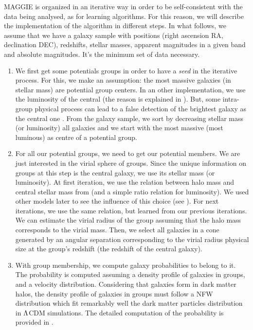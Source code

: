 MAGGIE is organized in an iterative way in order to be self-consistent with
the data being analysed, as for learning algorithms. For this reason, we
will describe the implementation of the algorithm in different steps. In
what follows, we assume that we have a galaxy sample with
positions (right ascension RA, declination DEC), redshifts, stellar masses,
apparent magnitudes in a given band and absolute magnitudes. It's the
minimum set of data necessary.
%
\begin{enumerate}
    \item We first get some potentials groups in order to have a \emph{seed} in
        the iterative process. For this, we make an assumption: the most
        massive galaxies (in stellar mass) are potential group centers. In an
        other implementation, we use the luminosity of the central (the reason
        is explained in ). But, some
        intra-group physical process can lead to a false detection of the
        brightest galaxy as the central one \citep{Ebeling+13}. From the galaxy
        sample, we sort by decreasing stellar mass (or luminosity) all galaxies
        and we start with the most massive (most luminous) as centre of a
        potential group.

    \item\label{step:2} For all our potential groups, we need to get our
        potential members. We are just interested in the virial sphere of
        groups. Since the unique information on groups at this step is the
        central galaxy, we use its stellar mass (or luminosity). At first
        iteration, we use the relation between halo mass and central stellar
        mass from \citet{BCW+10} (and a simple ratio relation for luminosity).
        We used other models later to see the influence of this choice (see
        ). For next iterations, we use the
        same relation, but learned from our previous iterations. We can
        estimate the virial radius of the group assuming that the halo mass
        corresponds to the virial mass. Then, we select all galaxies in a cone
        generated by an angular separation corresponding to the virial radius
        physical size at the group's redshift (the redshift of the central
        galaxy).

    \item With group membership, we compute galaxy probabilities to belong
        to it. The probability is computed assuming a density profile of
        galaxies in groups, and a velocity distribution. Considering that
        galaxies form in dark matter halos, the density profile of
        galaxies in groups must follow a NFW distribution \citep{NFW+97}
        which fit remarkably well the dark matter particles distribution in
        $\rm \Lambda$CDM simulations. The detailed computation of the
        probability is provided in .


\end{enumerate}
